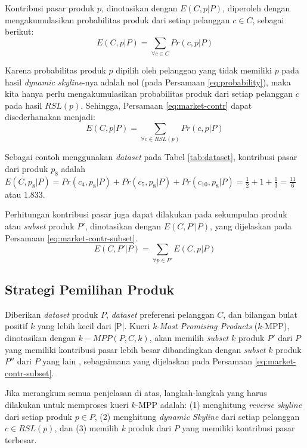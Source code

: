 Kontribusi pasar produk $p$, dinotasikan dengan $E(C, p|P)$, diperoleh dengan mengakumulasikan probabilitas produk dari setiap pelanggan $c \in C$, sebagai berikut:\\
\begin{equation}\label{eq:market-contr}
E(C, p|P) = \sum_{\forall c \in C} Pr(c, p|P)
\end{equation}

Karena probabilitas produk $p$ dipilih oleh pelanggan yang tidak memiliki $p$ pada hasil \textit{dynamic skyline}-nya adalah nol (pada Persamaan \ref{eq:probability}), maka kita hanya perlu mengakumulasikan probabilitas produk dari setiap pelanggan $c$ pada hasil $RSL(p)$. Sehingga, Persamaan \ref{eq:market-contr} dapat disederhanakan menjadi:
\begin{equation}\label{eq:market-contr-rsl}
E(C, p|P) = \sum_{\forall c \in RSL(p)} Pr(c, p|P)
\end{equation}

Sebagai contoh menggunakan \textit{dataset} pada Tabel \ref{tab:dataset}, kontribusi pasar dari produk $p_8$ adalah $E(C, p_8|P) = Pr(c_4, p_8|P) + Pr(c_5, p_8|P) + Pr(c_{10}, p_8|P) = \frac{1}{2} + 1 + \frac{1}{3} = \frac{11}{6}$ atau $1.833$.

Perhitungan kontribusi pasar juga dapat dilakukan pada sekumpulan produk atau \textit{subset} produk $P'$, dinotasikan dengan $E(C, P'|P)$, yang dijelaskan pada Persamaan \ref{eq:market-contr-subset}.
\begin{equation}\label{eq:market-contr-subset}
E(C, P'|P) = \sum_{\forall p \in P'} E(C, p|P)
\end{equation}

\subsection{Strategi Pemilihan Produk}
\tab Diberikan \textit{dataset} produk $P$, \textit{dataset} preferensi pelanggan $C$, dan bilangan bulat positif $k$ yang lebih kecil dari |P|. Kueri \textit{k-Most Promising Products} ($k$-MPP), dinotasikan dengan $k-MPP(P, C, k)$, akan memilih \textit{subset} $k$ produk $P'$ dari $P$ yang memiliki kontribusi pasar lebih besar dibandingkan dengan \textit{subset} $k$ produk $P''$ dari $P$ yang lain \cite{kmpp}, sebagaimana yang dijelaskan pada Persamaan \ref{eq:market-contr-subset}.

Jika merangkum semua penjelasan di atas, langkah-langkah yang harus dilakukan untuk memproses kueri $k$-MPP adalah: (1) menghitung \textit{reverse skyline} dari setiap produk $p \in P$, (2) menghitung \textit{dynamic Skyline} dari setiap pelanggan $c \in RSL(p)$, dan (3) memilih \textit{k} produk dari $P$ yang memiliki kontribusi pasar terbesar.

